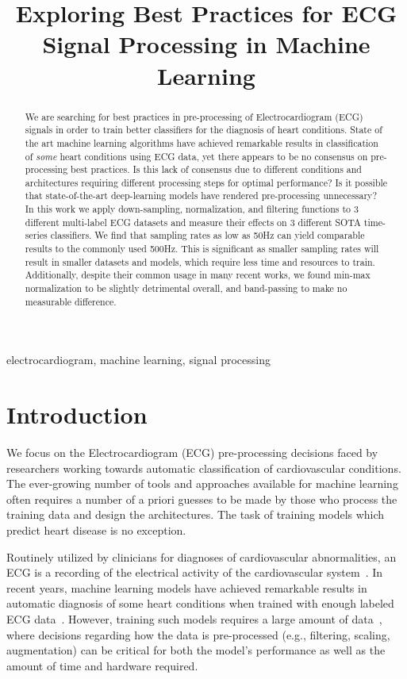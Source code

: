 \documentclass[pmlr,twocolumn]{jmlr}%
\title[ECG Scaling]{Exploring Best Practices for ECG Signal Processing in Machine Learning}
\author{\Name{Amir Salimi} \Email{{asalimi@ualberta.ca}\\
\Name{Abram Hindle} \Email{abram.hindle@ualberta.ca}\\
\Name{Osmar Zaiane} \Email{zaiane@ualberta.ca}\\
\Name{others} \Email{CVC@ualberta.ca}\\
\addr University of Alberta}}
\begin{document}
\maketitle

\begin{abstract}
We are searching for best practices in pre-processing of Electrocardiogram (ECG) signals in order to train better classifiers for the diagnosis of heart conditions.
State of the art machine learning algorithms have achieved remarkable results in classification of \textit{some} heart conditions using ECG data, yet there appears to be no consensus on pre-processing best practices.  Is this lack of consensus due to different conditions and architectures requiring different processing steps for optimal performance? Is it possible that state-of-the-art deep-learning models have rendered pre-processing unnecessary? In this work we apply down-sampling, normalization, and filtering functions to 3 different multi-label ECG datasets and measure their effects on 3 different SOTA time-series classifiers. We find that sampling rates as low as 50Hz can yield comparable results to the commonly used 500Hz. This is significant as smaller sampling rates will result in smaller datasets and models, which require less time and resources to train. Additionally, despite their common usage in many recent works, we found min-max normalization to be slightly detrimental overall, and band-passing to make no measurable difference. 

\end{abstract}
\begin{keywords}
electrocardiogram, machine learning, signal processing
\end{keywords}


\section{Introduction}
\label{sec:intro}
We focus on the Electrocardiogram (ECG) pre-processing decisions faced by researchers working towards automatic classification of cardiovascular conditions. The ever-growing number of tools and approaches available for machine learning often requires a number of a priori guesses to be made by those who process the training data and design the architectures. The task of training models which predict heart disease is no exception.

Routinely utilized by clinicians for diagnoses of cardiovascular abnormalities, an ECG is a recording of the electrical activity of the cardiovascular system~\citep{maleki2014use,uwaechia2021comprehensive}. In recent years, machine learning models have achieved remarkable results in automatic diagnosis of some heart conditions when trained with enough labeled ECG data~\citep{reyna2021will,reyna4issues,ribeiro2020automatic,chen2020detection,zhao2020adaptive}. However, training such models requires a large amount of data~\citep{reyna2021will,reyna4issues,zhao2020adaptive}, where decisions regarding how the data is pre-processed (e.g., filtering, scaling, augmentation) can be critical for both the model's performance as well as the amount of time and hardware required. 
\end{document}
